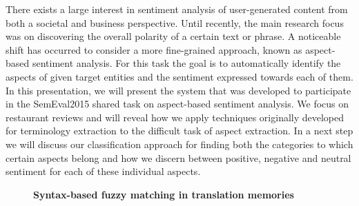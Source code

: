 \documentclass[10pt, a4paper, twopage, headinclude, footinclude, BCOR5mm]{scrartcl}
\begin{document}
\noindent
There exists a large interest in sentiment analysis of user-generated content from both a societal and business perspective. Until recently, the main research focus was on discovering the overall polarity of a certain text or phrase. A noticeable shift has occurred to consider a more fine-grained approach, known as aspect-based sentiment analysis. For this task the goal is to automatically identify the aspects of given target entities and the sentiment expressed towards each of them. In this presentation, we will present the system that was developed to participate in the SemEval2015 shared task on aspect-based sentiment analysis. We focus on restaurant reviews and will reveal how we apply techniques originally developed for terminology extraction to the difficult task of aspect extraction. In a next step we will discuss our classification approach for finding both the categories to which certain aspects belong and how we discern between positive, negative and neutral sentiment for each of these individual aspects.


\newpage

\begin{figure}[t!]
\centering
\large\textbf{Syntax-based fuzzy matching in translation memories}
\vspace*{0.5cm}
\end{figure}


        \begin{table}[t!]
    \end{table}
\end{document}
